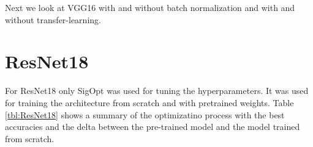 Next we look at VGG16 with and without batch normalization and with and without transfer-learning.

\begin{table}[h] \centering
{}
\caption{Hyper parameters for VGG16 and VGG16 with Batch Normalization (bn) optimized with SigOpt. First row shows hyperparameters training the architecture from scratch. Second row used pre-trained weights from ImageNet}
\label{tbl:VGG16}
\end{table}












\section{ResNet18}

For ResNet18 only SigOpt was used for tuning the hyperparameters. It was used for training the architecture from scratch and with pretrained weights. Table \ref{tbl:ResNet18} shows a summary of the optimizatino process with the best accuracies and the delta between the pre-trained model and the model trained from scratch.

\begin{table}[h] \centering
{}
\caption{Hyper parameters for ResNet18 optimized with SigOpt. First row shows hyperparameters training the architecture from scratch. Second row used pre-trained weights from ImageNet}
\label{tbl:ResNet18}
\end{table}

